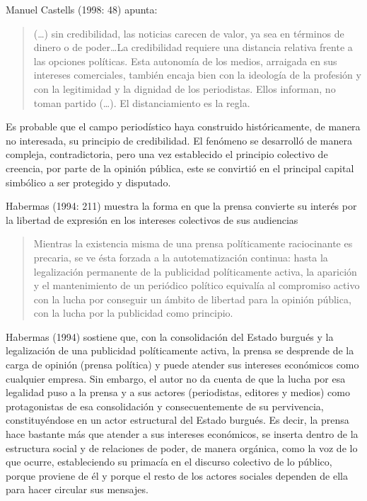 Manuel Castells (1998: 48) apunta:

\begin{quote}
(\ldots) sin credibilidad, las noticias carecen de valor, ya sea en términos de dinero o de poder\ldots La credibilidad requiere una distancia relativa frente a las opciones políticas. Esta autonomía de los medios, arraigada en sus intereses comerciales, también encaja bien con la ideología de la profesión y con la legitimidad y la dignidad de los periodistas. Ellos informan, no toman partido (\ldots). El distanciamiento es la regla.
\end{quote}

Es probable que el campo periodístico haya construido históricamente, de manera no interesada, su principio de credibilidad. El fenómeno se desarrolló de manera compleja, contradictoria, pero una vez establecido el principio colectivo de creencia, por parte de la opinión pública, este se convirtió en el principal capital simbólico a ser protegido y disputado.

Habermas (1994: 211) muestra la forma en que la prensa convierte su interés por la libertad de expresión en los intereses colectivos de sus audiencias

\begin{quote}
Mientras la existencia misma de una prensa políticamente raciocinante es precaria, se ve ésta forzada a la autotematización continua: hasta la legalización permanente de la publicidad políticamente activa, la aparición y el mantenimiento de un periódico político equivalía al compromiso activo con la lucha por conseguir un ámbito de libertad para la opinión pública, con la lucha por la publicidad como principio.
\end{quote}

Habermas (1994) sostiene que, con la consolidación del Estado burgués y la legalización de una publicidad políticamente activa, la prensa se desprende de la carga de opinión (prensa política) y puede atender sus intereses económicos como cualquier empresa. Sin embargo, el autor no da cuenta de que la lucha por esa legalidad puso a la prensa y a sus actores (periodistas, editores y medios) como protagonistas de esa consolidación y consecuentemente de su pervivencia, constituyéndose en un actor estructural del Estado burgués. Es decir, la prensa hace bastante más que atender a sus intereses económicos, se inserta dentro de la estructura social y de relaciones de poder, de manera orgánica, como la voz de lo que ocurre, estableciendo su primacía en el discurso colectivo de lo público, porque proviene de él y porque el resto de los actores sociales dependen de ella para hacer circular sus mensajes.

